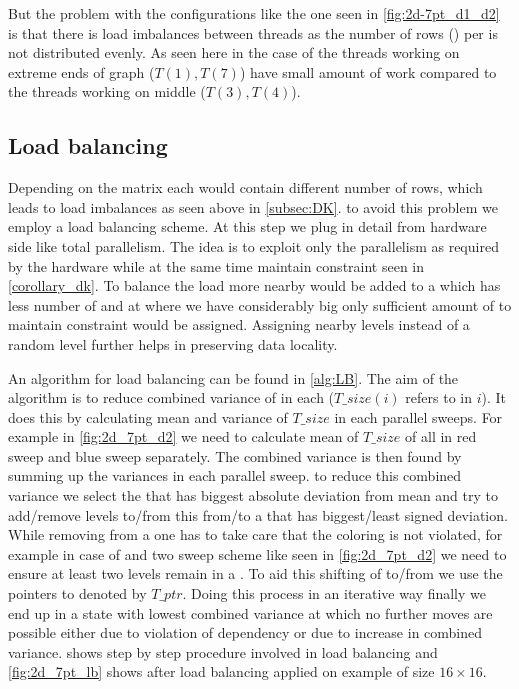   But the problem with the configurations like the one seen in \cref{fig:2d-7pt_d1_d2} is that there is load imbalances between threads as the number of rows (\nrows) per \levelGroup is not distributed evenly. As seen here in the case of \STEX the threads working on extreme ends of graph (\eg $T(1), T(7)$) have small amount of work compared to the threads working on middle (\eg $T(3), T(4)$). 
  
  \subsection{Load balancing}\label{subsec:LB}
  Depending on the matrix each \levelGroup would contain different number of rows, which leads to load imbalances as seen above in \cref{subsec:DK}. \Inorder to avoid this problem we employ a load balancing scheme. At this step we plug in detail from hardware side like total parallelism. The idea is to exploit only the parallelism as required by the hardware while at the same time maintain \DK constraint seen in \cref{corollary_dk}. To balance the load more nearby \levels would be added to a \levelGroup which has less number of \nrows and at \levelGroup where we have considerably big \levels only sufficient amount of \levels to maintain \DK constraint would be assigned. Assigning nearby levels instead of a random level further helps in preserving data locality. 
  
  An algorithm for load balancing can be found in \cref{alg:LB}. The aim of the algorithm is to reduce combined variance of \nrows in each \levelGroup ($T\_size(i)$ refers to \nrows in \levelGroup $i$). It does this by calculating mean and variance of $T\_size$ in each parallel sweeps. For example in \cref{fig:2d_7pt_d2} we need to calculate mean of $T\_size$ of all \levelGroups in red sweep and blue sweep separately. The combined variance is then found by summing up the variances in each parallel sweep. \Inorder to reduce this combined variance we select the \levelGroup that has biggest absolute deviation from mean and try to add/remove levels to/from this \levelGroup from/to a \levelGroup that has biggest/least signed deviation. While removing \levels from a \levelGroup one has to take care that the \DK coloring is not violated, for example in case of \DTWO and two sweep scheme like seen in \cref{fig:2d_7pt_d2} we need to ensure at least two levels remain in a \levelGroup. To aid this shifting of \levels to/from \levelGroup we use the pointers to \levelGroup denoted by $T\_ptr$. Doing this process in an iterative way finally we end up in a state with lowest combined variance at which no further moves are possible either due to violation of \DK dependency or due to increase in combined variance.  shows step by step procedure involved in load balancing and \cref{fig:2d_7pt_lb} shows \levelGroups after load balancing applied on \STEX example of size $16 \times 16.$

